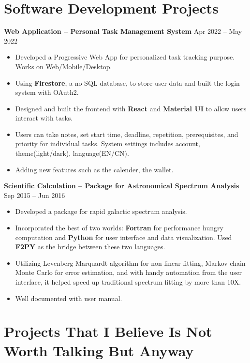 \documentclass[letterpaper,12pt]{article}
\newenvironment{zitemize}{
\begin{itemize} \vspace{-.9em}\itemsep 0pt \parskip 0pt}
{\end{itemize}\vspace{-.5em}}
\newcommand{\proglang}[1]{\textbf{#1}}
\begin{document}
\section{Software Development Projects}

\textbf{Web Application -- Personal Task Management System} \hfill Apr 2022 -- May 2022 \\
\begin{zitemize}
    \item Developed a Progressive Web App for personalized task tracking purpose. Works on Web/Mobile/Desktop.
    \item Using \proglang{Firestore}, a no-SQL database, to store user data and built the login system with OAuth2.
    \item Designed and built the frontend with \proglang{React} and \proglang{Material UI} to allow users interact with tasks.
    \item Users can take notes, set start time, deadline, repetition, prerequisites, and priority for individual tasks. System settings includes account, theme(light/dark), language(EN/CN).
    \item Adding new features such as the calender, the wallet.
\end{zitemize}

\textbf{Scientific Calculation -- Package for Astronomical Spectrum Analysis} \hfill Sep 2015 -- Jun 2016 \\
\begin{zitemize}
    \item Developed a package for rapid galactic spectrum analysis.
    \item Incorporated the best of two worlds: \proglang{Fortran} for performance hungry computation and \proglang{Python} for user interface and data visualization. Used \proglang{F2PY} as the bridge between these two languages.
    \item Utilizing Levenberg-Marquardt algorithm for non-linear fitting, Markov chain Monte Carlo for error estimation, and with handy automation from the user interface, it helped speed up traditional spectrum fitting by more than 10X. 
    \item Well documented with user manual.
\end{zitemize}



\section{Projects That I Believe Is Not Worth Talking But Anyway}
\end{document}
